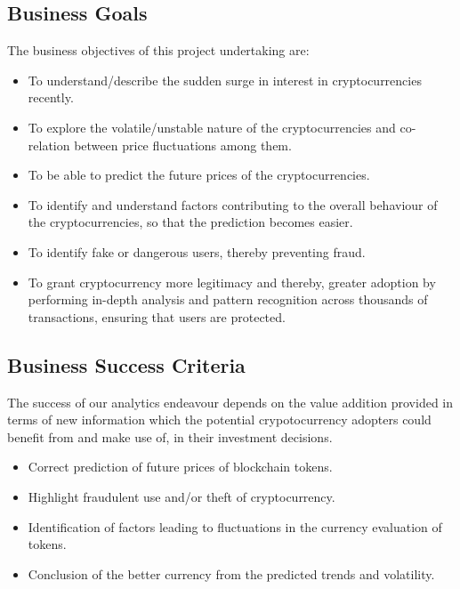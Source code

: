 \documentclass{article}
\begin{document}
\subsection{Business Goals}
The business objectives of this project undertaking are:
\begin{itemize}
    \item  To understand/describe the sudden surge in interest in cryptocurrencies recently.
    \item  To explore the volatile/unstable nature of the cryptocurrencies and co-relation between price fluctuations among them. 
    \item  To be able to predict the future prices of the cryptocurrencies.
    \item  To identify  and understand factors contributing to the overall behaviour of the cryptocurrencies, so that the prediction becomes easier.
    \item  To identify fake or dangerous users, thereby preventing fraud.
    \item  To grant cryptocurrency more legitimacy and thereby, greater adoption by performing in-depth analysis and pattern recognition across thousands of transactions, ensuring that users are protected.
\end{itemize}

\subsection{Business Success Criteria}
The success of our analytics endeavour depends on the value addition provided in terms of new information which the potential crypotocurrency adopters could benefit from and make use of, in their investment decisions. 
\begin{itemize}
    \item Correct prediction of future prices of blockchain tokens.
    \item Highlight fraudulent use and/or theft of cryptocurrency.
    \item Identification of factors leading to fluctuations in the currency evaluation of tokens.
    \item Conclusion of the better currency from the predicted trends and volatility. 
\end{itemize}
\end{document}
